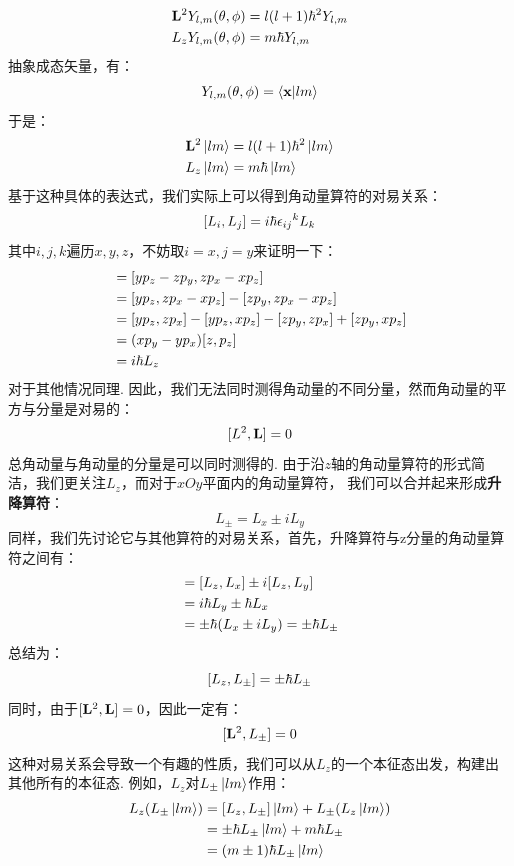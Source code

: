 \begin{align*}
& \mathbf{L}^2Y_{l,m}(\theta,\phi) = l(l+1)\hbar^2Y_{l,m} \\
& L_{z}Y_{l,m}(\theta,\phi) = m\hbar Y_{l,m}
\end{align*}
抽象成态矢量，有：
\[
Y_{l,m}(\theta,\phi) = \bra{\mathbf{x}}\ket{lm}
\]
于是：
\begin{align*}
& \mathbf{L}^2\ket{lm} = l(l+1)\hbar^2\ket{lm} \\
& L_{z}\ket{lm} = m\hbar\ket{lm}
\end{align*}
基于这种具体的表达式，我们实际上可以得到角动量算符的对易关系：
\[
[{L}_{i},{L}_{j}] = i\hbar{\epsilon_{ij}}^{k}{L}_{k}
\]
其中\(i,j,k\)遍历\(x,y,z\)，不妨取\(i=x,j=y\)来证明一下：
\begin{align*}
[{L}_{x},{L}_{y}]
& = [y{p}_{z}-z{p}_{y},z{p}_{x}-x{p}_{z}] \\
& = [y{p}_{z},z{p}_{x}-x{p}_{z}] - [z{p}_{y},z{p}_{x}-x{p}_{z}] \\
& = [y{p}_{z},z{p}_{x}] - [y{p}_{z},x{p}_{z}] - [z{p}_{y},z{p}_{x}] + [z{p}_{y},x{p}_{z}] \\
& = (x{p}_{y}-y{p}_{x})[z,{p}_{z}] \\
& = i\hh{L}_{z}
\end{align*}
对于其他情况同理. 因此，我们无法同时测得角动量的不同分量，然而角动量的平方与分量是对易的：
\[
[{L}^{2},{\mathbf{L}}] = 0 
\]
总角动量与角动量的分量是可以同时测得的. 由于沿\(z\)轴的角动量算符的形式简洁，我们更关注\(L_{z}\)，而对于\(xOy\)平面内的角动量算符，
我们可以合并起来形成\textbf{升降算符}：
\[
{L}_{\pm} = {L}_{x} \pm i{L}_{y}
\]
同样，我们先讨论它与其他算符的对易关系，首先，升降算符与z分量的角动量算符之间有：
\begin{align*}
[{L}_{z},{L}_{\pm}] 
& = [{L}_{z},{L}_{x}] \pm i[{L}_{z},{L}_{y}] \\
& = i\hh{L}_{y} \pm \hh{L}_{x} \\
& = \pm\hh({L}_{x}\pm i{L}_{y}) = \pm\hh{L}_{\pm}
\end{align*}
总结为：
\[
[{L}_{z},{L}_{\pm}] = \pm\hbar{L}_{\pm}
\]
同时，由于\([{\mathbf{L}}^{2},{\mathbf{L}}] = 0\)，因此一定有：
\[
[{\mathbf{L}}^{2},{L}_{\pm}] = 0
\]
这种对易关系会导致一个有趣的性质，我们可以从\({L}_{z}\)的一个本征态出发，构建出其他所有的本征态. 例如，\({L}_{z}\)对\({L}_{\pm}\ket{lm}\)作用：
\begin{align*}
{L}_{z}({L}_{\pm}\ket{lm})
& = [{L}_{z},{L}_{\pm}]\ket{lm} + {L}_{\pm}({L}_{z}\ket{lm}) \\
& = \pm\hbar{L}_{\pm}\ket{lm} + m\hbar{L}_{\pm} \\
& = (m\pm1)\hbar{L}_{\pm}\ket{lm}
\end{align*}
